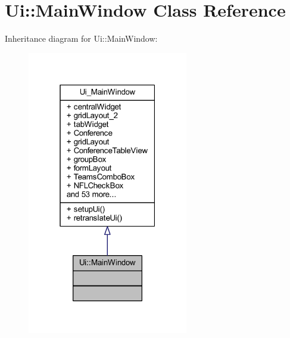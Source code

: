 \hypertarget{class_ui_1_1_main_window}{}\section{Ui\+:\+:Main\+Window Class Reference}
\label{class_ui_1_1_main_window}


Inheritance diagram for Ui\+:\+:Main\+Window\+:
\nopagebreak
\begin{figure}[H]
\begin{center}
\leavevmode
\includegraphics[width=199pt]{class_ui_1_1_main_window__inherit__graph}
\end{center}
\end{figure}


